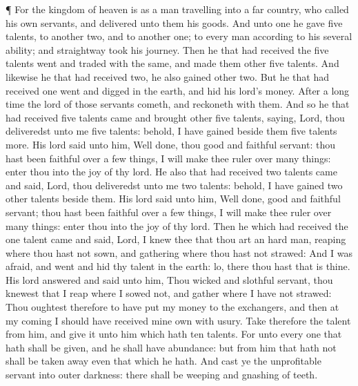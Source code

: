  ¶ For the kingdom of heaven is as a man travelling into a
far country, who called his own servants, and delivered unto them his
goods.  And unto one he gave five talents, to another two,
and to another one; to every man according to his several ability; and
straightway took his journey.  Then he that had received
the five talents went and traded with the same, and made them other five
talents.  And likewise he that had received two, he also
gained other two.  But he that had received one went and
digged in the earth, and hid his lord's money.  After a
long time the lord of those servants cometh, and reckoneth with them.
 And so he that had received five talents came and brought
other five talents, saying, Lord, thou deliveredst unto me five talents:
behold, I have gained beside them five talents more.  His
lord said unto him, Well done, thou good and faithful servant: thou hast
been faithful over a few things, I will make thee ruler over many
things: enter thou into the joy of thy lord.  He also that
had received two talents came and said, Lord, thou deliveredst unto me
two talents: behold, I have gained two other talents beside them.
 His lord said unto him, Well done, good and faithful
servant; thou hast been faithful over a few things, I will make thee
ruler over many things: enter thou into the joy of thy lord.
 Then he which had received the one talent came and said,
Lord, I knew thee that thou art an hard man, reaping where thou hast not
sown, and gathering where thou hast not strawed:  And I was
afraid, and went and hid thy talent in the earth: lo, there thou hast
that is thine.  His lord answered and said unto him, Thou
wicked and slothful servant, thou knewest that I reap where I sowed not,
and gather where I have not strawed:  Thou oughtest
therefore to have put my money to the exchangers, and then at my coming
I should have received mine own with usury.  Take therefore
the talent from him, and give it unto him which hath ten talents.
 For unto every one that hath shall be given, and he shall
have abundance: but from him that hath not shall be taken away even that
which he hath.  And cast ye the unprofitable servant into
outer darkness: there shall be weeping and gnashing of teeth.

